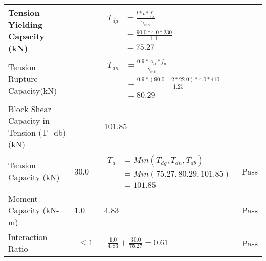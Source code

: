 \documentclass{article}%
\begin{document}
\begin{longtable}{|p{4cm}|p{5cm}|p{5.5cm}|p{1.5cm}|}
\hline%
Tension Yielding Capacity (kN)&&$\begin{aligned} T_{dg} &= \frac{l*t*f_y}{\gamma_{mo}}\\ &=\frac{90.0*4.0*230}{1.1}\\ &=75.27\end{aligned}$&\\%
\hline%
Tension Rupture Capacity(kN)&&$\begin{aligned} T_{dn} &= \frac{0.9*A_{n}*f_u}{\gamma_{m1}}\\ &=\frac{0.9*(90.0-2*22.0)*4.0*410}{1.25}\\ &=80.29\end{aligned}$&\\%
\hline%
Block Shear Capacity in Tension (T\_db) (kN)&&101.85&\\%
\hline%
Tension Capacity (kN)&30.0&$\begin{aligned} T_d &= Min(T_{dg},T_{dn},T_{db})\\ &= Min(75.27,80.29,101.85)\\ &=101.85\end{aligned}$&Pass\\%
\hline%
Moment Capacity (kN{-}m)&1.0&4.83&Pass\\%
\hline%
Interaction Ratio&$\begin{aligned} \leq1\end{aligned}$&$\begin{aligned} \frac{1.0}{4.83}+\frac{30.0}{75.27}=0.61\end{aligned}$&Pass\\%
\hline%
\end{longtable}

%
\end{document}
